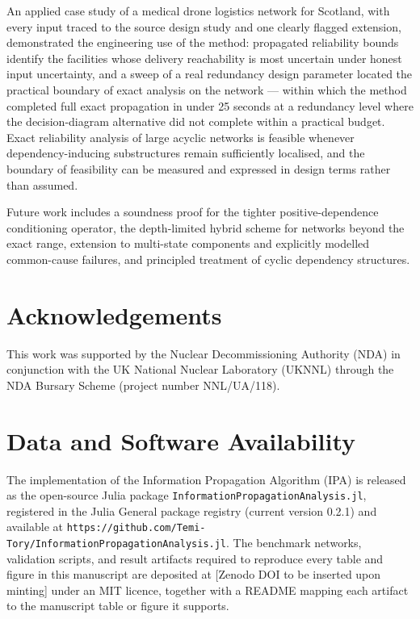 \documentclass[preprint,12pt]{elsarticle}
\theoremstyle{definition}
\begin{document}
An applied case study of a medical drone logistics network for Scotland, with every input traced to the
source design study and one clearly flagged extension, demonstrated the engineering use of the method:
propagated reliability bounds identify the facilities whose delivery reachability is most uncertain
under honest input uncertainty, and a sweep of a real redundancy design parameter located the practical
boundary of exact analysis on the network --- within which the method completed full exact propagation
in under 25 seconds at a redundancy level where the decision-diagram alternative did not complete within
a practical budget. Exact reliability analysis of large acyclic networks is feasible whenever
dependency-inducing substructures remain sufficiently localised, and the boundary of feasibility can be
measured and expressed in design terms rather than assumed.

Future work includes a soundness proof for the tighter positive-dependence conditioning operator, the
depth-limited hybrid scheme for networks beyond the exact range, extension to multi-state components and
explicitly modelled common-cause failures, and principled treatment of cyclic dependency structures.

\section*{Acknowledgements}
This work was supported by the Nuclear Decommissioning Authority (NDA) in conjunction with the UK National
Nuclear Laboratory (UKNNL) through the NDA Bursary Scheme (project number NNL/UA/118).

\section*{Data and Software Availability}
The implementation of the Information Propagation Algorithm (IPA) is released as the open-source Julia
package \texttt{InformationPropagationAnalysis.jl}, registered in the Julia General package registry
(current version 0.2.1) and available at
\texttt{https://github.com/Temi-Tory/InformationPropagationAnalysis.jl}. The benchmark networks,
validation scripts, and result artifacts required to reproduce every table and figure in this manuscript
are deposited at [Zenodo DOI to be inserted upon minting] under an MIT licence, together with a README
mapping each artifact to the manuscript table or figure it supports.

\end{document}
